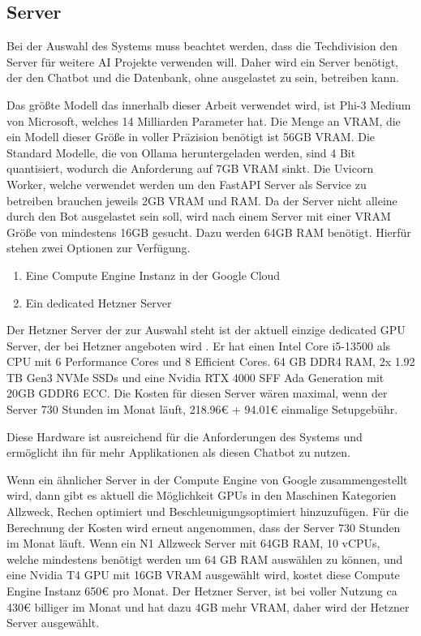 \subsection{Server}
\label{s:konz:ser}
Bei der Auswahl des Systems muss beachtet werden, dass die Techdivision den Server
für weitere AI Projekte verwenden will. Daher wird ein Server benötigt, der den Chatbot
und die Datenbank, ohne ausgelastet zu sein, betreiben kann.\par
Das größte Modell das innerhalb dieser Arbeit verwendet wird, ist Phi-3 
Medium von Microsoft, welches 14 Milliarden Parameter hat. Die Menge 
an VRAM, die ein Modell dieser Größe in voller Präzision benötigt ist 
56GB VRAM. Die Standard Modelle, die von Ollama heruntergeladen 
werden, sind 4 Bit quantisiert, wodurch die 
Anforderung auf 7GB VRAM sinkt. Die Uvicorn Worker, welche verwendet 
 werden um den FastAPI Server als Service zu betreiben brauchen 
 jeweils 2GB VRAM und RAM. Da der Server nicht alleine durch den Bot 
 ausgelastet sein soll, wird nach einem Server mit einer VRAM Größe von 
 mindestens 16GB gesucht. Dazu werden 64GB RAM benötigt.
Hierfür stehen zwei Optionen zur Verfügung. 
\begin{enumerate}
    \item Eine Compute Engine Instanz in der Google Cloud 
    \item Ein dedicated Hetzner Server
\end{enumerate}
Der Hetzner Server der zur Auswahl steht ist der aktuell einzige 
dedicated GPU Server, der bei Hetzner angeboten wird \cite{DedicatedServerHosting}. 
Er hat einen Intel Core i5-13500 als CPU mit 6 Performance Cores und 
8 Efficient Cores. 64 GB DDR4 RAM, 2x 1.92 TB Gen3 NVMe SSDs und eine 
Nvidia RTX 4000 SFF Ada Generation mit 20GB GDDR6 ECC. 
Die Kosten für diesen Server wären maximal, wenn der Server 730 Stunden im Monat 
läuft, 218.96€ + 94.01€ einmalige Setupgebühr.\par
Diese Hardware ist ausreichend für die Anforderungen des Systems und ermöglicht 
ihn für mehr Applikationen als diesen Chatbot zu nutzen.\par
Wenn ein ähnlicher Server in der Compute Engine von Google zusammengestellt wird,
 dann gibt es aktuell die Möglichkeit GPUs in den 
Maschinen Kategorien Allzweck, Rechen optimiert und Beschleunigungsoptimiert hinzuzufügen.
Für die Berechnung der Kosten wird erneut angenommen, dass der Server 730 Stunden 
im Monat läuft. Wenn ein N1 Allzweck Server mit 64GB RAM, 10 vCPUs, welche 
mindestens benötigt werden um 64 GB RAM auswählen zu können, und eine 
Nvidia T4 GPU mit 16GB VRAM ausgewählt wird, kostet diese Compute Engine 
Instanz 650€ pro Monat.
Der Hetzner Server, ist bei voller Nutzung ca 430€
billiger im Monat und hat dazu 4GB mehr VRAM, daher wird der 
Hetzner Server ausgewählt.\par

